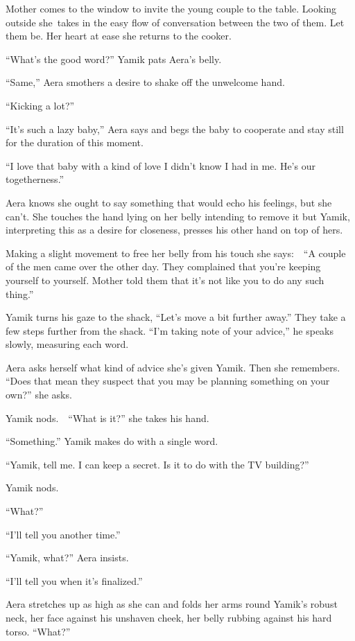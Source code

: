\documentclass[twoside,11pt]{book}
\begin{document}
Mother comes to the window to invite the young couple to the table. Looking outside she{\ }takes in the
easy flow of conversation between the two of them. Let them be. Her heart at ease she returns to the cooker.

``What's the good word?'' Yamik pats Aera's belly. 

``Same,'' Aera smothers a desire to shake off the unwelcome hand. 

``Kicking a lot?'' 

``It's such a lazy baby,'' Aera says and begs the baby to cooperate and stay still for the
duration of this moment. 

``I love that baby with a kind of love I didn't know I had in me. He's our togetherness.''

Aera knows she ought to say something that would echo his feelings, but she can't. She touches the hand lying on her
belly intending to remove it but Yamik, interpreting this as a desire for closeness, presses his other hand on top of
hers. 

Making a slight movement to free her belly from his touch she says:\ \ ``A couple of the men came over the
other day. They complained that you're keeping yourself to yourself. Mother told them that it's not like you to do any
such thing.'' 

Yamik turns his gaze to the shack, ``Let's move a bit further away.'' They take a few steps
further from the shack. ``I'm taking note of your advice,'' he speaks slowly, measuring each
word. 

Aera asks herself what kind of advice she{}'s given Yamik. Then she remembers. ``Does that mean they
suspect that you may be planning something on your own?'' she asks.

Yamik nods.\ \ ``What is it?'' she takes his hand. 

``Something.'' Yamik makes do with a single word. 

``Yamik, tell me. I can keep a secret. Is it to do with the TV building?'' 

Yamik nods. 

``What?'' 

``I'll tell you another time.'' 

``Yamik, what?'' Aera insists.

``I'll tell you when it's finalized.'' 

Aera stretches up as high as she can and folds her arms round Yamik's robust neck, her face against his unshaven cheek,
her belly rubbing against his hard torso. ``What?'' 
\end{document}
